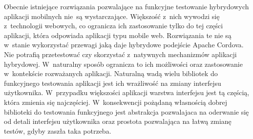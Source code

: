 \documentclass[brudnopis]{xmgr}
\begin{document}
Obecnie istniejące rozwiązania pozwalające na funkcyjne testowanie hybrydowych aplikacji mobilnych nie~są wystarczające. Większość z~nich wywodzi się z~technologii webowych, co ogranicza ich zastosowanie tylko do tej części aplikacji, która odpowiada aplikacji typu mobile web. Rozwiązania te nie są w~stanie wykorzystać przewagi jaką daje hybrydowe podejście Apache Cordova. Nie potrafią przetestować czy skorzystać z~natywnych mechanizmów aplikacji hybrydowej. W~naturalny sposób ogranicza to ich możliwości oraz zastosowanie w~kontekście rozważanych aplikacji. Naturalną wadą wielu bibliotek do funkcyjnego testowania aplikacji jest ich wrażliwość na zmiany interfejsu użytkownika. W~przypadku większości aplikacji warstwa interfejsu jest tą częścią, która zmienia się najczęściej. W~konsekwencji pożądaną własnością dobrej biblioteki do testowania funkcyjnego jest abstrakcja pozwalajaca na oderwanie się od detali interfejsu użytkownika oraz prostota pozwalająca na łatwą zmianę testów, gdyby zaszła taka potrzeba. 
\end{document}
